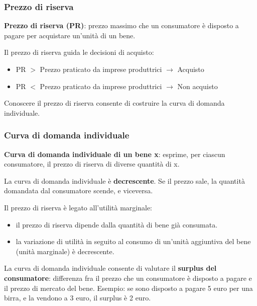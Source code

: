 \documentclass[../main.tex]{subfiles}
\begin{document}
\subsubsection{Prezzo di riserva}

\textbf{Prezzo di riserva (PR)}: prezzo massimo che un consumatore è disposto a pagare per acquistare un'unità di un bene.

Il prezzo di riserva guida le decisioni di acquisto:
\begin{itemize}
\item PR $>$ Prezzo praticato da imprese produttrici $\rightarrow$ Acquisto
\item PR $<$ Prezzo praticato da imprese produttrici $\rightarrow$ Non acquisto
\end{itemize}

Conoscere il prezzo di riserva consente di costruire la curva di domanda individuale.

\subsubsection{Curva di domanda individuale}

\textbf{Curva di domanda individuale di un bene x}: esprime, per ciascun consumatore, il prezzo di riserva di diverse quantità di x.

La curva di domanda individuale è \textbf{decrescente}. Se il prezzo sale, la quantità domandata dal consumatore scende, e viceversa.

Il prezzo di riserva è legato all'utilità marginale:
\begin{itemize}
\item  il prezzo di riserva dipende dalla quantità di bene già consumata.
\item la variazione di utilità in seguito al consumo di un'unità aggiuntiva del bene (unità marginale) è decrescente.
\end{itemize}

La curva di domanda individuale consente di valutare il \textbf{surplus del consumatore}: differenza fra il prezzo che un consumatore è disposto a pagare e il prezzo di mercato del bene. Esempio: se sono disposto a pagare 5 euro per una birra, e la vendono a 3 euro, il surplus è 2 euro.\\
\end{document}

